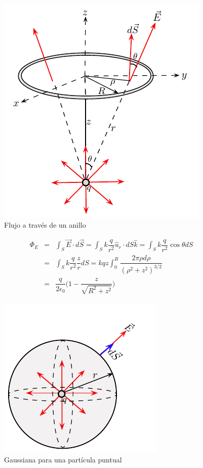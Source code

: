 \begin{figure}[h]
\begin{center}
\includegraphics[scale=0.8]{electrostatica/flujo1}
\end{center}
\caption{Flujo a través de un anillo}
\label{figflujo1}
\end{figure}

\begin{eqnarray}
\nonumber
\Phi_E &=& \int_S \vec{E} \cdot d \vec{S} = \int_S k \dfrac{q}{r^2}\hat{u}_r \cdot dS \hat{k} = \int_S k \dfrac{q}{r^2}\cos\theta dS\\
&=&  \int_S k \dfrac{q}{r^2}\dfrac{z}{r} dS = kqz\int_0^R \dfrac{2\pi\rho d\rho}{(\rho^2+z^2)^{3/2}} \\ \nonumber
&=& \dfrac{q}{2 \epsilon_0 }\bigg(1-\dfrac{z}{\sqrt{R^2+z^2} } \bigg)
\end{eqnarray}

\vspace*{0.5 cm}

\begin{figure}[h]
\begin{center}
\includegraphics[scale=0.8]{electrostatica/gauss3}
\end{center}
\caption{Gaussiana para una partícula puntual}
\label{figgauss3}
\end{figure}

